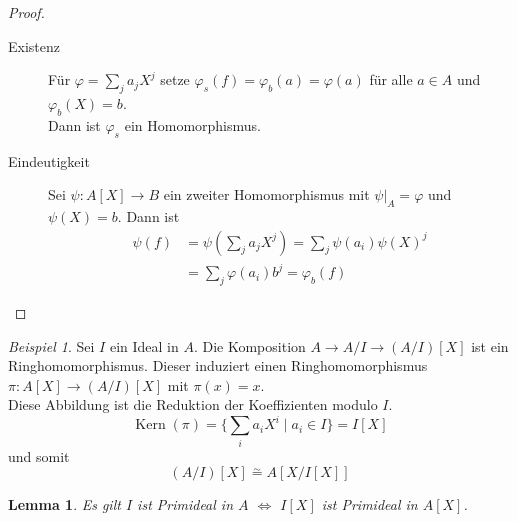 \documentclass[10pt,a4paper]{article}
\newcommand{\isom}{\overset{\sim}{=}}
\newcommand{\Kern}{\operatorname{Kern}}
\theoremstyle{plain}
\newtheorem{lem}[theorem]{Lemma}
\theoremstyle{definition}
\theoremstyle{remark}
\newtheorem{exm}[theorem]{Beispiel}
\begin{document}
	\begin{proof}
		\begin{description}
			\item[Existenz] Für $\varphi=\sum_j a_jX^j$ setze $\varphi_s(f)=\varphi_b(a)=\varphi(a)$ für alle $a\in A$ und $\varphi_b(X)=b$.\\
			Dann ist $\varphi_s$ ein Homomorphismus.
			\item[Eindeutigkeit] Sei $\psi:A[X]\to B$ ein zweiter Homomorphismus mit $\psi|_A=\varphi$ und $\psi(X)=b$. Dann ist
			\begin{align*}
			\psi(f)&=\psi\left(\sum_ja_jX^j\right)=\sum_j\psi(a_i)\psi(X)^j\\
			&=\sum_j\varphi(a_i)b^j=\varphi_b(f)
			\end{align*}
		\end{description}
	\end{proof}
	
	\begin{exm}
		Sei $I$ ein Ideal in $A$. Die Komposition $A\to A/I\to(A/I)[X]$ ist ein Ringhomomorphismus. Dieser induziert einen Ringhomomorphismus $\pi:A[X]\to(A/I)[X]$ mit $\pi(x)=x$.\\
		Diese Abbildung ist die Reduktion der Koeffizienten modulo $I$.
		\[\Kern(\pi)=\{\sum_ia_iX^i\mid a_i\in I\}=I[X]\]
		und somit
		\[(A/I)[X]\isom A[X/I[X]]\]
	\end{exm}

	\begin{lem}
		Es gilt $I$ ist Primideal in $A$ $\Leftrightarrow$ $I[X]$ ist Primideal in $A[X]$.
	\end{lem}
\end{document}
